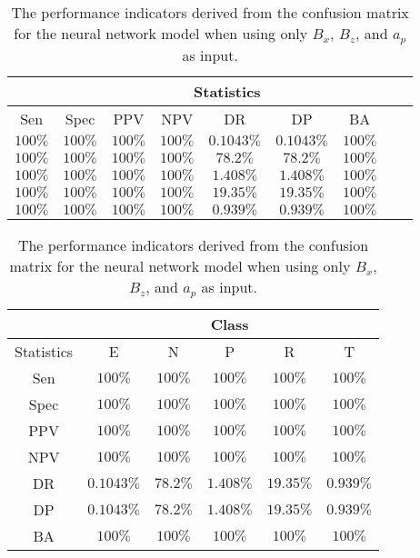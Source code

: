 \begin{table}[!ht]
	\centering
	\begin{tabular}{|c|c|c|c|c|c|c|c|c|}
		\hline
		 & \multicolumn{7}{c|}{Statistics} \\ \hline
		Sen & Spec & PPV & NPV & DR & DP & BA \\ \hline
		$100\%$ & $100\%$ & $100\%$ & $100\%$ & $0.1043\%$ & $0.1043\%$ & $100\%$ \\ \hline
		$100\%$ & $100\%$ & $100\%$ & $100\%$ & $78.2\%$ & $78.2\%$ & $100\%$ \\ \hline
		$100\%$ & $100\%$ & $100\%$ & $100\%$ & $1.408\%$ & $1.408\%$ & $100\%$ \\ \hline
		$100\%$ & $100\%$ & $100\%$ & $100\%$ & $19.35\%$ & $19.35\%$ & $100\%$ \\ \hline
		$100\%$ & $100\%$ & $100\%$ & $100\%$ & $0.939\%$ & $0.939\%$ & $100\%$ \\ \hline
	\end{tabular}
	\caption{The performance indicators derived from the confusion matrix for the neural network model when using only $B_{x}$, $B_{z}$, and $a_{p}$ as input.}
	\label{tab:cs:xzap:nnet}
\end{table}

\begin{table}[!ht]
	\centering
	\begin{tabular}{|c|c|c|c|c|c|}
		\hline
		 & \multicolumn{5}{c|}{Class} \\ \hline
		Statistics & E & N & P & R & T \\ \hline
		Sen & $100\%$ & $100\%$ & $100\%$ & $100\%$ & $100\%$ \\ \hline
		Spec & $100\%$ & $100\%$ & $100\%$ & $100\%$ & $100\%$ \\ \hline
		PPV & $100\%$ & $100\%$ & $100\%$ & $100\%$ & $100\%$ \\ \hline
		NPV & $100\%$ & $100\%$ & $100\%$ & $100\%$ & $100\%$ \\ \hline
		DR & $0.1043\%$ & $78.2\%$ & $1.408\%$ & $19.35\%$ & $0.939\%$ \\ \hline
		DP & $0.1043\%$ & $78.2\%$ & $1.408\%$ & $19.35\%$ & $0.939\%$ \\ \hline
		BA & $100\%$ & $100\%$ & $100\%$ & $100\%$ & $100\%$ \\ \hline
	\end{tabular}
	\caption{The performance indicators derived from the confusion matrix for the neural network model when using only $B_{x}$, $B_{z}$, and $a_{p}$ as input.}
	\label{tab:cs:reverse:xzap:nnet}
\end{table}
